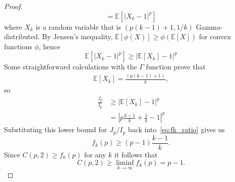\documentclass[10pt,a4paper]{amsart}
\newcommand{\abs}[1]{|#1|}
\begin{document}
\begin{proof}
\begin{equation}
= \mathbb{E}[\abs{X_k - 1}^p] 
\end{equation}
where $X_k$ is a random variable that is
$(p(k-1)+1,1/k)$ Gamma-distributed.
By Jensen's inequality, $\mathbb{E}[\phi(X)]
\ge \phi(\mathbb{E}[X])$
for convex functions $\phi$, hence
\begin{equation}
\mathbb{E}[|X_k-1|^p] \ge \abs{\mathbb{E}[X_k] - 1}^p 
\end{equation}
Some straightforward calculations
with the $\Gamma$ function prove that
\begin{align*}
\mathbb{E}[X_k]= \frac{(p(k-1)+1)}k,
\end{align*}
so
\begin{align*}
\frac{J_p}{I_p}& \ge \abs{\mathbb{E}[X_k] - 1}^p \\
&= \left|p\frac{k-1}k+\frac1k-1\right|^p
\end{align*}
Substituting this lower bound for $J_p/I_p$ back
into~\eqref{eq:fk_ratio} gives us
\begin{equation*}
 f_k(p) \ge (p-1)\frac{k-1}{k}.
\end{equation*}
Since $C(p,2)\ge f_k(p)$ for any $k$ it follows that
\begin{equation*}
    C(p,2)\ge \liminf_{k\to \infty}f_k(p)=p-1.
\end{equation*}
\end{proof}
\end{document}
